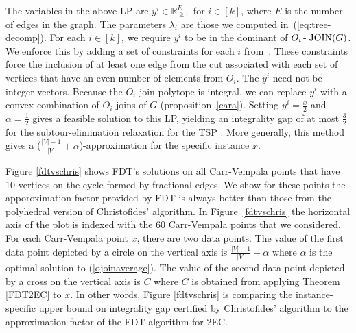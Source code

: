 The variables in the above LP are $y^i\in \mathbb{R}^{E}_{\geq 0}$ for $i\in [k]$, where $E$ is the number of edges in the graph.  The parameters $\lambda_i$ are those we computed in~(\ref{eq:tree-decomp}). For each $i\in [k]$, we require $y^i$ to be in the dominant of $O_i\operatorname{-\;JOIN}(G)$.  We enforce this by adding a set of constraints for each $i$ from~\cite[p. 490]{schrijverbook}. These constraints force the inclusion of at least one edge from the cut associated with each set of vertices that have an even number of elements from $O_i$. The  $y^i$ need not be integer vectors. Because the $O_i$-join polytope is integral, we can replace $y^i$ with a convex combination of $O_i$-joins of $G$ (proposition~\ref{cara}). Setting $y^i = \frac{x}{2}$ and $\alpha = \frac{1}{2}$ gives a feasible solution to this LP, yielding an integrality gap of at most $\frac{3}{2}$ for the subtour-elimination relaxation for the TSP \cite{wolsey}. More generally, this method gives a ($\frac{|V|-1}{|V|}+\alpha$)-approximation for the specific instance $x$. %



Figure \ref{fdtvschris} shows FDT's solutions on all Carr-Vempala points that have 10 vertices on the cycle formed by fractional edges. We show for these points the apporoximation factor provided by FDT is always better than those from the polyhedral version of Christofides' algorithm. In Figure~\ref{fdtvschris} the horizontal axis of the plot is indexed with the 60 Carr-Vempala points that we considered. For each Carr-Vempala point $x$, there are two data points. The value of the first data point depicted by a circle on the vertical axis is $\frac{|V|-1}{|V|}+\alpha$  where $\alpha$ is the optimal solution to (\ref{ojoinaverage}).
The value of the second data point depicted by a cross on the vertical axis is $C$ where $C$ is obtained from applying Theorem \ref{FDT2EC} to $x$. In other words, Figure \ref{fdtvschris} is comparing the instance-specific upper bound on integrality gap certified by Christofides' algorithm to the approximation factor of the FDT algorithm for 2EC.

